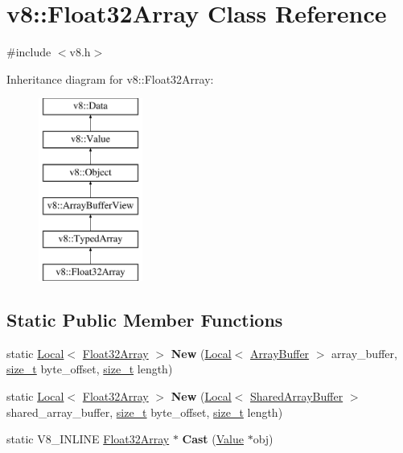 \hypertarget{classv8_1_1Float32Array}{}\section{v8\+:\+:Float32\+Array Class Reference}
\label{classv8_1_1Float32Array}


{\ttfamily \#include $<$v8.\+h$>$}

Inheritance diagram for v8\+:\+:Float32\+Array\+:\begin{figure}[H]
\begin{center}
\leavevmode
\includegraphics[height=6.000000cm]{classv8_1_1Float32Array}
\end{center}
\end{figure}
\subsection*{Static Public Member Functions}
\begin{DoxyCompactItemize}
\item 
\mbox{\label{classv8_1_1Float32Array_af7e2ce97268849289d8ab38fd07fbf62}} 
static \mbox{\hyperlink{classv8_1_1Local}{Local}}$<$ \mbox{\hyperlink{classv8_1_1Float32Array}{Float32\+Array}} $>$ {\bfseries New} (\mbox{\hyperlink{classv8_1_1Local}{Local}}$<$ \mbox{\hyperlink{classv8_1_1ArrayBuffer}{Array\+Buffer}} $>$ array\+\_\+buffer, \mbox{\hyperlink{classsize__t}{size\+\_\+t}} byte\+\_\+offset, \mbox{\hyperlink{classsize__t}{size\+\_\+t}} length)
\item 
\mbox{\label{classv8_1_1Float32Array_af3140edf1f13845670f4e4ddd41200c3}} 
static \mbox{\hyperlink{classv8_1_1Local}{Local}}$<$ \mbox{\hyperlink{classv8_1_1Float32Array}{Float32\+Array}} $>$ {\bfseries New} (\mbox{\hyperlink{classv8_1_1Local}{Local}}$<$ \mbox{\hyperlink{classv8_1_1SharedArrayBuffer}{Shared\+Array\+Buffer}} $>$ shared\+\_\+array\+\_\+buffer, \mbox{\hyperlink{classsize__t}{size\+\_\+t}} byte\+\_\+offset, \mbox{\hyperlink{classsize__t}{size\+\_\+t}} length)
\item 
\mbox{\label{classv8_1_1Float32Array_adf926d03cacd4b3901d7f9750671a350}} 
static V8\+\_\+\+I\+N\+L\+I\+NE \mbox{\hyperlink{classv8_1_1Float32Array}{Float32\+Array}} $\ast$ {\bfseries Cast} (\mbox{\hyperlink{classv8_1_1Value}{Value}} $\ast$obj)
\end{DoxyCompactItemize}
